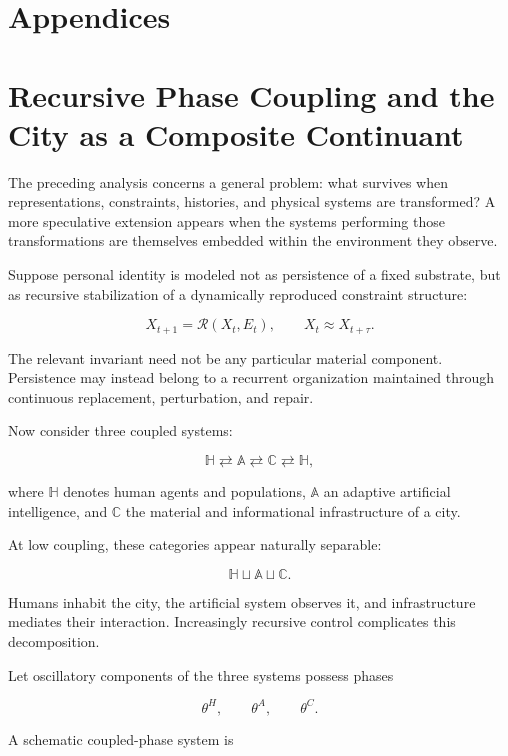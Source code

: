 \documentclass[11pt]{article}
\begin{document}
\newpage 
\section*{Appendices}

\appendix

\section{Recursive Phase Coupling and the City as a Composite Continuant}

The preceding analysis concerns a general problem: what survives when representations, constraints, histories, and physical systems are transformed? A more speculative extension appears when the systems performing those transformations are themselves embedded within the environment they observe.

Suppose personal identity is modeled not as persistence of a fixed substrate, but as recursive stabilization of a dynamically reproduced constraint structure:

\[
X_{t+1}=\mathcal{R}(X_t,E_t),
\qquad
X_t\approx X_{t+\tau}.
\]

The relevant invariant need not be any particular material component. Persistence may instead belong to a recurrent organization maintained through continuous replacement, perturbation, and repair.

Now consider three coupled systems:

\[
\mathbb{H}\rightleftarrows\mathbb{A}
\rightleftarrows\mathbb{C}
\rightleftarrows\mathbb{H},
\]

where $\mathbb{H}$ denotes human agents and populations, $\mathbb{A}$ an adaptive artificial intelligence, and $\mathbb{C}$ the material and informational infrastructure of a city.

At low coupling, these categories appear naturally separable:

\[
\mathbb{H}\sqcup\mathbb{A}\sqcup\mathbb{C}.
\]

Humans inhabit the city, the artificial system observes it, and infrastructure mediates their interaction. Increasingly recursive control complicates this decomposition.

Let oscillatory components of the three systems possess phases

\[
\theta^{H},\qquad\theta^{A},\qquad\theta^{C}.
\]

A schematic coupled-phase system is \cite{kuramoto1975,strogatz2000kuramoto}
\end{document}
